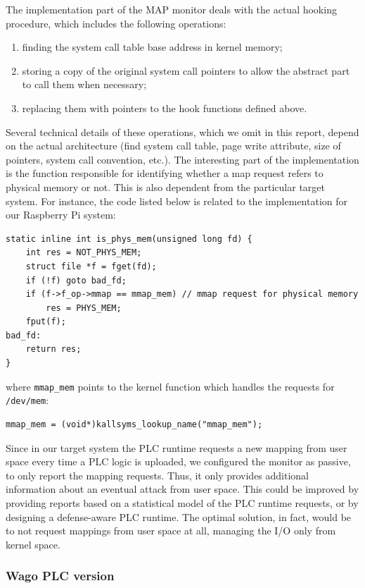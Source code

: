 The implementation part of the MAP monitor deals with the actual hooking procedure, which includes the following operations:
\begin{enumerate}
	\item finding the system call table base address in kernel memory;
	\item storing a copy of the original system call pointers to allow the abstract part to call them when necessary;
	\item replacing them with pointers to the hook functions defined above.
\end{enumerate}
Several technical details of these operations, which we omit in this report, depend on the actual architecture
(\eg find system call table, page write attribute, size of pointers, system call convention, etc.).
The interesting part of the implementation is the function responsible for identifying whether a map request refers to physical memory or not.
This is also dependent from the particular target system.
For instance, the code listed below is related to the  implementation for our Raspberry Pi system:
\begin{lstlisting}
static inline int is_phys_mem(unsigned long fd) {
	int res = NOT_PHYS_MEM;
	struct file *f = fget(fd);
	if (!f) goto bad_fd;
	if (f->f_op->mmap == mmap_mem) // mmap request for physical memory
		res = PHYS_MEM;
	fput(f);
bad_fd:
	return res;
}
\end{lstlisting}
where \verb|mmap_mem| points to the kernel function which handles the requests for \verb|/dev/mem|:
\begin{lstlisting}
mmap_mem = (void*)kallsyms_lookup_name("mmap_mem");
\end{lstlisting}

Since in our target system the PLC runtime requests a new mapping from user space every time a PLC logic is uploaded,
we configured the monitor as passive, to only report the mapping requests. Thus, it only provides additional information about an eventual attack from user space.
This could be improved by providing reports based on a statistical model of the PLC runtime requests, or by designing a defense-aware PLC runtime.
The optimal solution, in fact, would be to not request mappings from user space at all, managing the I/O only from kernel space.


\subsubsection{Wago PLC version}

